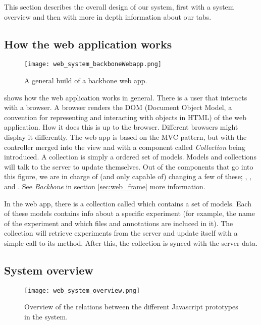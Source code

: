 This section describes the overall design of our system, first with a system overview and then with more in depth information about our tabs.
\subsection{How the web application works}
\begin{figure}[h!]
\centering
\texttt{[image: web\_system\_backboneWebapp.png]}
\caption{\label{fig:web_system_backboneWebapp}A general build of a backbone web app.}
\end{figure}

 shows how the web application works in general. There is a user that interacts with a browser. A browser renders the DOM (Document Object Model, a convention for representing and interacting with objects in HTML) of the web application. How it does this is up to the browser. Different browsers might display it differently. The web app is based on the MVC pattern, but with the controller merged into the view and with a component called \textit{Collection} being introduced. A collection is simply a ordered set of models. Models and collections will talk to the server to update themselves. Out of the components that go into this figure, we are in charge of (and only capable of) changing a few of these; , ,  and . See \textit{Backbone} in section \ref{sec:web_frame} more information. 
\pagebreak
\begin{example}
In the web app, there is a collection called  which contains a set of  models. Each of these models contains info about a specific experiment (for example, the name of the experiment and which files and annotations are incluced in it). The collection will retrieve experiments from the server and update itself with a simple call to its  method. After this, the collection is synced with the server data.
\end{example}

\subsection{System overview}
\begin{figure}[h!]
\centering
\texttt{[image: web\_system\_overview.png]}
\caption{\label{fig:web_system_overview}Overview of the relations between the different Javascript prototypes in the system.}
\end{figure}

